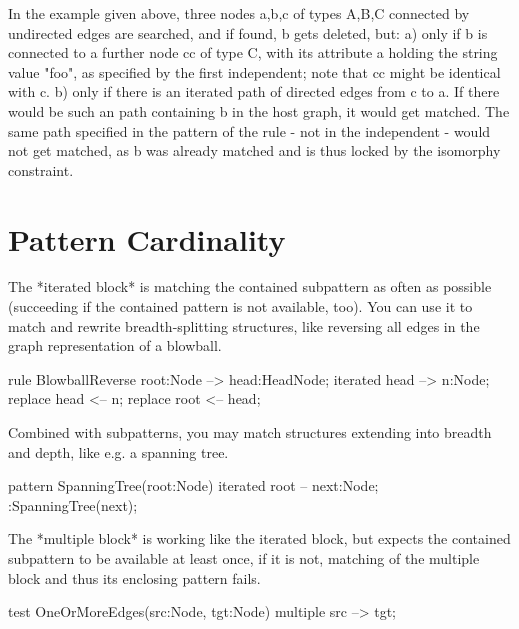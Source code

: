 In the example given above, three nodes a,b,c of types A,B,C
connected by undirected edges are searched, and if found, b gets deleted, but:
a) only if b is connected to a further node cc of type C,
with its attribute a holding the string value "foo", as specified 
by the first independent; note that cc might be identical with c.
b) only if there is an iterated path of directed edges from c to a.
If there would be such an path containing b in the host graph, 
it would get matched. The same path specified in the pattern of the rule 
- not in the independent - would not get matched, as b was already matched
and is thus locked by the isomorphy constraint.

  
\section{Pattern Cardinality}
\label{pc}

The *iterated block* is matching the contained subpattern as often as possible
(succeeding if the contained pattern is not available, too).
You can use it to match and rewrite breadth-splitting structures,
like reversing all edges in the graph representation of a blowball.

\begin{example}
  \begin{grgen}
rule BlowballReverse {
  root:Node --> head:HeadNode;
  iterated {
    head --> n:Node;
	replace {
	  head <-- n;
	}
  }
  replace { 
    root <-- head;
  }
}
  \end{grgen}
\end{example}

Combined with subpatterns, you may match structures extending into breadth and depth,
like e.g. a spanning tree.

\begin{example}
  \begin{grgen}
pattern SpanningTree(root:Node)
{
  iterated {
    root -- next:Node;
    :SpanningTree(next);
  }
}
  \end{grgen}
\end{example}

The *multiple block* is working like the iterated block, 
but expects the contained subpattern to be available at least once,
if it is not, matching of the multiple block and thus its enclosing pattern fails.

\begin{example}
  \begin{grgen}
test OneOrMoreEdges(src:Node, tgt:Node)
{
  multiple {
    src --> tgt;
  }
}
  \end{grgen}
\end{example}

